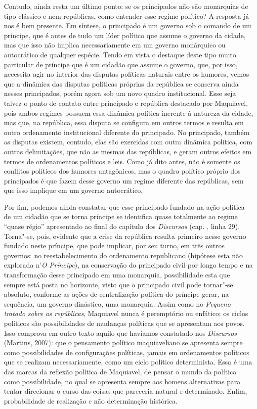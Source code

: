 Contudo, ainda resta um último ponto: se os principados não são
monarquias de tipo clássico e nem repúblicas, como entender esse regime
político? A resposta já nos é bem presente. Em síntese, o principado é
um governo sob o comando de um príncipe, que é antes de tudo um líder
político que assume o governo da cidade, mas que isso não implica
necessariamente em um governo monárquico ou autocrático de qualquer
espécie. Tendo em vista o destaque deste tipo muito particular de
príncipe que é um cidadão que assume o governo, que, por isso, necessita
agir no interior das disputas políticas naturais entre os humores, vemos
que a dinâmica das disputas políticas próprias da república se conserva
ainda nesses principados, porém agora sob um novo quadro institucional.
Esse seja talvez o ponto de contato entre principado e república
destacado por Maquiavel, pois ambos regimes possuem essa dinâmica
política inerente à natureza da cidade, mas que, na república, essa
disputa se configura em outros termos e resulta em outro ordenamento
institucional diferente do principado. No principado, também as disputas
existem, contudo, elas são exercidas com outra dinâmica política, com
outras delimitações, que não as mesmas das repúblicas, e geram outros
efeitos em termos de ordenamentos políticos e leis. Como já dito antes,
não é somente os conflitos políticos dos humores antagônicos, mas o
quadro político próprio dos principados é que fazem desse governo um
regime diferente das repúblicas, sem que isso implique em um governo
autocrático.

Por fim, podemos ainda constatar que esse principado fundado na ação
política de um cidadão que se torna príncipe se identifica quase
totalmente ao regime ``quase régio'' apresentado ao final do capítulo
 dos \emph{Discursos} (cap. , linha 29). Torna"-se, pois,
evidente que a crise da república resulta primeiro nesse governo fundado
neste príncipe, que pode implicar, por seu turno, em três outros
governos: no reestabelecimento do ordenamento republicano (hipótese esta
não explorada n'\emph{O Príncipe}), na conservação do principado civil
por longo tempo e na transformação desse principado em uma monarquia,
possibilidade esta que sempre está posta no horizonte, visto que o
principado civil pode tornar"-se absoluto, conforme as ações de
centralização política do príncipe gerar, na sequência, um governo
dinástico, uma monarquia. Assim como no \emph{Pequeno tratado sobre as
repúblicas}, Maquiavel nunca é peremptório ou enfático: os ciclos
políticos são possibilidades de mudanças políticas que se apresentam aos
povos. Isso comprova em outro texto aquilo que havíamos constatado nos
\emph{Discursos} (Martins, 2007): que o pensamento político
maquiaveliano se apresenta sempre como possibilidades de configurações
políticas, jamais em ordenamentos políticos que se realizam
necessariamente, como um ciclo político determinista. Essa é uma das
marcas da reflexão política de Maquiavel, de pensar o mundo da política
como possibilidade, no qual se apresenta sempre aos homens alternativas
para tentar direcionar o curso das coisas que pareceria natural e
determinado. Enfim, probabilidade de realização e não determinação
histórica.

